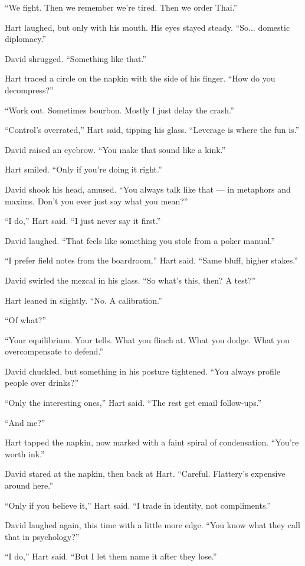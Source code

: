 “We fight. Then we remember we’re tired. Then we order Thai.”

Hart laughed, but only with his mouth. His eyes stayed steady. “So... domestic diplomacy.”

David shrugged. “Something like that.”

Hart traced a circle on the napkin with the side of his finger. “How do you decompress?”

“Work out. Sometimes bourbon. Mostly I just delay the crash.”

“Control’s overrated,” Hart said, tipping his glass. “Leverage is where the fun is.”

David raised an eyebrow. “You make that sound like a kink.”

Hart smiled. “Only if you’re doing it right.”

David shook his head, amused. “You always talk like that — in metaphors and maxims. Don’t 
you ever just say what you mean?”

“I do,” Hart said. “I just never say it first.”

David laughed. “That feels like something you stole from a poker manual.”

“I prefer field notes from the boardroom,” Hart said. “Same bluff, higher stakes.”

David swirled the mezcal in his glass. “So what’s this, then? A test?”

Hart leaned in slightly. “No. A calibration.”

“Of what?”

“Your equilibrium. Your tells. What you flinch at. What you dodge. What you overcompensate to defend.”

David chuckled, but something in his posture tightened. “You always profile people over drinks?”

“Only the interesting ones,” Hart said. “The rest get email follow-ups.”

“And me?”

Hart tapped the napkin, now marked with a faint spiral of condensation. “You’re worth ink.”

David stared at the napkin, then back at Hart. “Careful. Flattery’s expensive around here.”

“Only if you believe it,” Hart said. “I trade in identity, not compliments.”

David laughed again, this time with a little more edge. “You know what they call that in psychology?”

“I do,” Hart said. “But I let them name it after they lose.”

